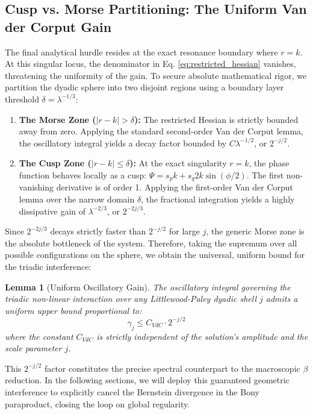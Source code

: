 \documentclass[12pt,a4paper]{article}
\theoremstyle{plain}
\newtheorem{lemma}[theorem]{Lemma}
\theoremstyle{definition}
\theoremstyle{remark}
\begin{document}
\subsection{Cusp vs. Morse Partitioning: The Uniform Van der Corput Gain}
The final analytical hurdle resides at the exact resonance boundary where $r = k$. At this singular locus, the denominator in Eq. \eqref{eq:restricted_hessian} vanishes, threatening the uniformity of the gain. To secure absolute mathematical rigor, we partition the dyadic sphere into two disjoint regions using a boundary layer threshold $\delta = \lambda^{-1/3}$:
\begin{enumerate}
    \item \textbf{The Morse Zone ($|r - k| > \delta$):} The restricted Hessian is strictly bounded away from zero. Applying the standard second-order Van der Corput lemma, the oscillatory integral yields a decay factor bounded by $C \lambda^{-1/2}$, or $2^{-j/2}$.
    \item \textbf{The Cusp Zone ($|r - k| \leq \delta$):} At the exact singularity $r=k$, the phase function behaves locally as a cusp: $\Psi = s_p k + s_q 2k \sin(\phi/2)$. The first non-vanishing derivative is of order 1. Applying the first-order Van der Corput lemma over the narrow domain $\delta$, the fractional integration yields a highly dissipative gain of $\lambda^{-2/3}$, or $2^{-2j/3}$.
\end{enumerate}
Since $2^{-2j/3}$ decays strictly faster than $2^{-j/2}$ for large $j$, the generic Morse zone is the absolute bottleneck of the system. Therefore, taking the supremum over all possible configurations on the sphere, we obtain the universal, uniform bound for the triadic interference:
\begin{lemma}[Uniform Oscillatory Gain]\label{lem:vdc_gain}
The oscillatory integral governing the triadic non-linear interaction over any Littlewood-Paley dyadic shell $j$ admits a uniform upper bound proportional to:
\begin{equation}
    \gamma_j \leq C_{VdC} \cdot 2^{-j/2}
\end{equation}
where the constant $C_{VdC}$ is strictly independent of the solution's amplitude and the scale parameter $j$.
\end{lemma}
This $2^{-j/2}$ factor constitutes the precise spectral counterpart to the macroscopic $\beta$ reduction. In the following sections, we will deploy this guaranteed geometric interference to explicitly cancel the Bernstein divergence in the Bony paraproduct, closing the loop on global regularity.
\end{document}
